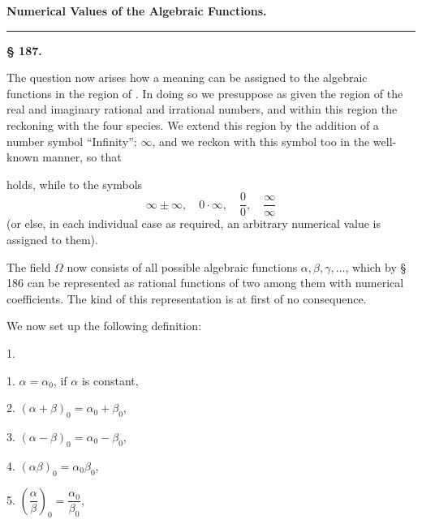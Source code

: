 
\begin{center}

\textbf{Numerical Values of the Algebraic Functions.}

\rule{4cm}{0.4pt}

\textbf{§ 187. }
\end{center}

The question now arises how a meaning can be assigned to the algebraic
functions in the region of . In doing so we presuppose as given
the region of the real and imaginary rational and irrational numbers,
and within this region the reckoning with the four species. We extend
this region by the addition of a number symbol ``Infinity'': $\infty$,
and we reckon with this symbol too in the well-known manner, so that


holds, while to the symbols
\[
\infty \pm \infty, \quad 0 \cdot \infty, \quad \frac{0}{0}, \quad \frac{\infty}{\infty}
\]
 (or else, in each individual case as required, an
arbitrary numerical value is assigned to them).

The field $\Omega$ now consists of all possible algebraic
functions $\alpha, \beta, \gamma, \dots$, which by § 186 can be represented
as rational functions of two among them with numerical coefficients. The
kind of this representation is at first of no consequence.

We now set up the following definition:

1. 

\begin{center}
\begin{minipage}{0.7\linewidth}
1. \quad $\alpha = \alpha_0$, if $\alpha$ is constant,

2. \quad $(\alpha + \beta)_0 = \alpha_0 + \beta_0$,

3. \quad $(\alpha - \beta)_0 = \alpha_0 - \beta_0$,

4. \quad $(\alpha\beta)_0 = \alpha_0\beta_0$,

5. \quad $\left(\dfrac{\alpha}{\beta}\right)_0 = \dfrac{\alpha_0}{\beta_0}$,
\end{minipage}
\end{center}

